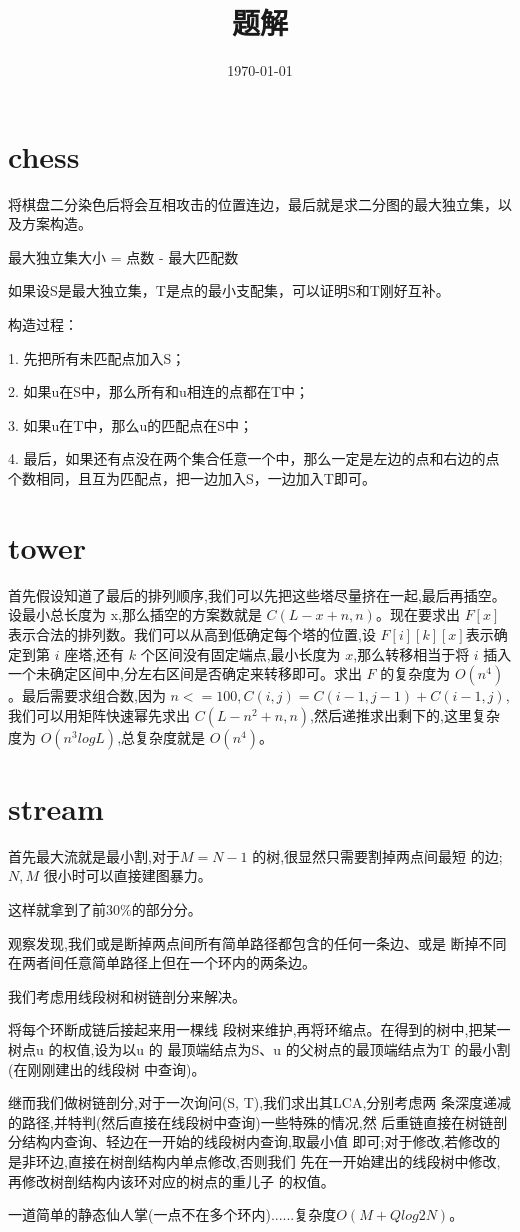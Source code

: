 \documentclass[a4paper,10pt]{article}
\title{题解}
\date{\today}
\begin{document}
	\maketitle
	\section{chess}
	     将棋盘二分染色后将会互相攻击的位置连边，最后就是求二分图的最大独立集，以及方案构造。
	     
	     最大独立集大小 = 点数 - 最大匹配数
	     
	     如果设S是最大独立集，T是点的最小支配集，可以证明S和T刚好互补。
	     
	     构造过程：
	     
	     1. 先把所有未匹配点加入S；
	     
	     2. 如果u在S中，那么所有和u相连的点都在T中；
	     
	     3. 如果u在T中，那么u的匹配点在S中；
	     
	     4. 最后，如果还有点没在两个集合任意一个中，那么一定是左边的点和右边的点个数相同，且互为匹配点，把一边加入S，一边加入T即可。
	     
	   
	\section{tower}
		首先假设知道了最后的排列顺序,我们可以先把这些塔尽量挤在一起,最后再插空。设最小总长度为 x,那么插空的方案数就是 $C(L-x+n,n)$。现在要求出 $F[x]$表示合法的排列数。我们可以从高到低确定每个塔的位置,设 $F[i][k][x]$表示确定到第 $i$ 座塔,还有 $k$ 个区间没有固定端点,最小长度为 $ x $,那么转移相当于将 $ i $ 插入一个未确定区间中,分左右区间是否确定来转移即可。求出 $ F $ 的复杂度为 $ O(n^4) $。最后需要求组合数,因为 $ n<=100,C(i,j)=C(i-1,j-1)+C(i-1,j) $,我们可以用矩阵快速幂先求出 $ C(L-n^2+n,n) $,然后递推求出剩下的,这里复杂度为 $ O(n^3logL) $,总复杂度就是 $ O(n^4) $。
	
	\section{stream}
		首先最大流就是最小割,对于$ M=N-1 $ 的树,很显然只需要割掉两点间最短
		的边;$ N,M $ 很小时可以直接建图暴力。
		
		这样就拿到了前30\%的部分分。
		
		观察发现,我们或是断掉两点间所有简单路径都包含的任何一条边、或是
		断掉不同在两者间任意简单路径上但在一个环内的两条边。
		
		
		我们考虑用线段树和树链剖分来解决。
		
		将每个环断成链后接起来用一棵线
		段树来维护,再将环缩点。在得到的树中,把某一树点u 的权值,设为以u 的
		最顶端结点为S、u 的父树点的最顶端结点为T 的最小割(在刚刚建出的线段树
		中查询)。
		
		继而我们做树链剖分,对于一次询问(S, T),我们求出其LCA,分别考虑两
		条深度递减的路径,并特判(然后直接在线段树中查询)一些特殊的情况,然
		后重链直接在树链剖分结构内查询、轻边在一开始的线段树内查询,取最小值
		即可;对于修改,若修改的是非环边,直接在树剖结构内单点修改,否则我们
		先在一开始建出的线段树中修改,再修改树剖结构内该环对应的树点的重儿子
		的权值。
		
		一道简单的静态仙人掌(一点不在多个环内)......复杂度$ O(M +Qlog 2 N) $。
	
\end{document}
